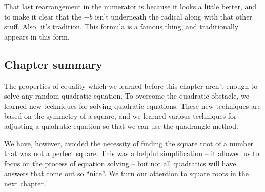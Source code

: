 That last rearrangement in the numerator is because it looks a little better, and to make it clear that the $-b$ isn't underneath the radical along with that other stuff. Also, it's tradition. This formula is a famous thing, and traditionally appears in this form.

\subsection*{Chapter summary}

The properties of equality which we learned before this chapter aren't enough to solve any random quadratic equation. To overcome the quadratic obstacle, we learned new techniques for solving quadratic equations. These new techniques are based on the symmetry of a square, and we learned various techniques for adjusting a quadratic equation so that we can use the quadrangle method.

We have, however, avoided the necessity of finding the square root of a number that was not a perfect square. This was a helpful simplification -- it allowed us to focus on the process of equation solving -- but not all quadratics will have answers that come out so ``nice''. We turn our attention to square roots in the next chapter.
